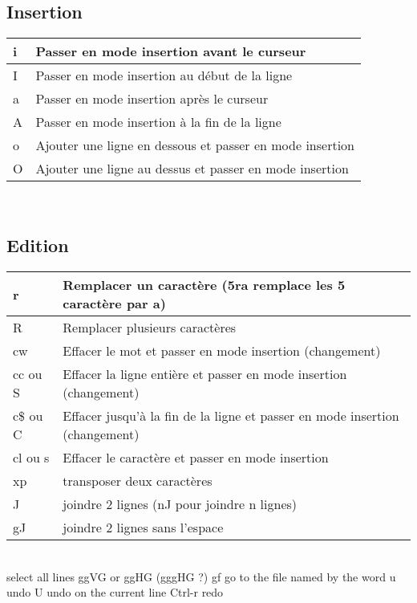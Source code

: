 \documentclass{article}
\begin{document}
\subsection{Insertion}
\begin{tabular}{|p{3cm}| l| }
\hline
i & Passer en mode insertion avant le curseur\\ \hline
I & Passer en mode insertion au début de la ligne\\ \hline
a & Passer en mode insertion après le curseur\\ \hline
A & Passer en mode insertion à la fin de la ligne\\ \hline
o & Ajouter une ligne en dessous et passer en mode insertion \\ \hline
O & Ajouter une ligne au dessus et passer en mode insertion \\ \hline
\end{tabular}\\
\subsection{Edition}
\begin{tabular}{|p{3cm}| l| }
\hline
r & Remplacer un caractère (5ra remplace les 5 caractère par a)\\ \hline
R & Remplacer plusieurs caractères\\ \hline
cw & Effacer le mot et passer en mode insertion (changement)\\ \hline
cc ou S & Effacer la ligne entière et passer en mode insertion (changement)\\ \hline
c\$ ou C & Effacer jusqu'à la fin de la ligne et passer en mode insertion (changement)\\ \hline
cl ou s & Effacer le caractère et passer en mode insertion \\ \hline
xp & transposer deux caractères\\ \hline
J & joindre 2 lignes (nJ pour joindre n lignes)\\ \hline
gJ &joindre 2 lignes sans l'espace\\ \hline
\end{tabular}\\

select all lines ggVG or ggHG (gggHG ?)
gf go to the file named by the word
u undo
U undo on the current line
Ctrl-r redo
    
\end{document}
